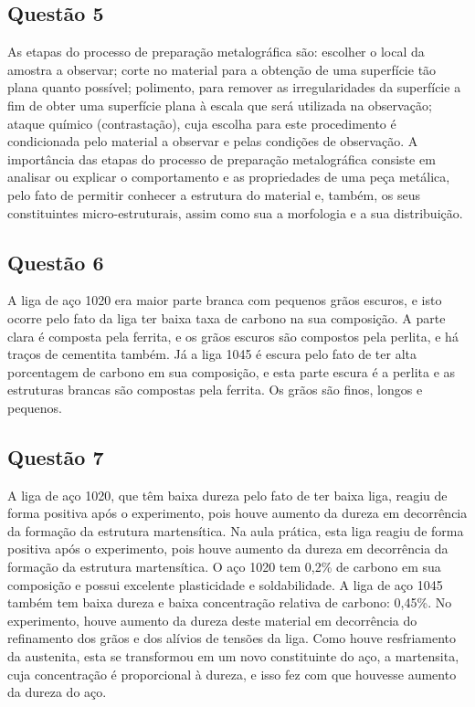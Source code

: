 \documentclass[journal]{IEEEtran}
\begin{document}
\subsection*{Questão 5}


As etapas do processo de preparação metalográfica são: escolher o 
local da amostra a observar; corte no material para a obtenção de uma 
superfície tão plana quanto possível; polimento, para remover as 
irregularidades da superfície a fim de obter uma superfície plana à 
escala que será utilizada na observação; ataque químico 
(contrastação), cuja escolha para este procedimento é condicionada 
pelo material a observar e pelas condições de observação.
A importância das etapas do processo de preparação metalográfica 
consiste em analisar ou explicar o comportamento e as propriedades de 
uma peça metálica, pelo fato de permitir conhecer a estrutura do 
material e, também, os seus constituintes micro-estruturais, assim 
como sua a morfologia e a sua distribuição.
\subsection*{Questão 6}


A liga de aço 1020 era maior parte branca com pequenos grãos escuros, 
e isto ocorre pelo fato da liga ter baixa taxa de carbono na sua 
composição. A parte clara é composta pela ferrita, e os grãos escuros 
são compostos pela perlita, e há traços de cementita também. Já a liga 
1045 é escura pelo fato de ter alta porcentagem de carbono em sua 
composição, e esta parte escura é a perlita e as estruturas brancas 
são compostas pela ferrita. Os grãos são finos, longos e pequenos.
\subsection*{Questão 7}

A liga de aço 1020, que têm baixa dureza pelo fato de ter baixa liga, 
reagiu de forma positiva após o experimento, pois houve aumento da 
dureza em decorrência da formação da estrutura martensítica.
Na aula 
prática, esta liga reagiu de forma positiva após o experimento, pois 
houve aumento da dureza em decorrência da formação da estrutura 
martensítica. O aço 1020 tem 0,2\% de carbono em sua composição e 
possui excelente plasticidade e soldabilidade.
A liga de aço 1045 também tem baixa dureza e baixa concentração 
relativa de carbono: 0,45\%. No experimento, houve aumento da dureza 
deste material em decorrência do refinamento dos grãos e dos alívios 
de tensões da liga. Como houve resfriamento da austenita, esta se 
transformou em um novo constituinte do aço, a martensita, cuja 
concentração é proporcional à dureza, e isso fez com que houvesse 
aumento da dureza do aço.
\end{document}
